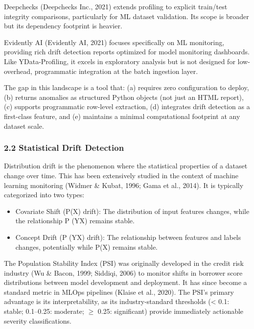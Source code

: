 \documentclass{article}
\begin{document}
Deepchecks (Deepchecks Inc., 2021) extends profiling to explicit
train/test integrity comparisons, particularly for ML dataset
validation. Its scope is broader but its dependency footprint is
heavier.

Evidently AI (Evidently AI, 2021) focuses specifically on ML monitoring,
providing rich drift detection reports optimized for model monitoring
dashboards. Like YData-Profiling, it excels in exploratory analysis but
is not designed for low-overhead, programmatic integration at the batch
ingestion layer.

The gap in this landscape is a tool that: (a) requires zero
configuration to deploy, (b) returns anomalies as structured Python
objects (not just an HTML report), (c) supports programmatic row-level
extraction, (d) integrates drift detection as a first-class feature, and
(e) maintains a minimal computational footprint at any dataset scale.

\subsubsection{2.2 Statistical Drift
Detection}\label{statistical-drift-detection}

Distribution drift is the phenomenon where the statistical properties of
a dataset change over time. This has been extensively studied in the
context of machine learning monitoring (Widmer \& Kubat, 1996; Gama et
al., 2014). It is typically categorized into two types:

\begin{itemize}
\item
  Covariate Shift (P(X) drift): The distribution of input features
  changes, while the relationship P (Y\textbar X) remains stable.
\item
  Concept Drift (P (Y\textbar X) drift): The relationship between
  features and labels changes, potentially while P(X) remains stable.
\end{itemize}

The Population Stability Index (PSI) was originally developed in the
credit risk industry (Wu \& Bacon, 1999; Siddiqi, 2006) to monitor
shifts in borrower score distributions between model development and
deployment. It has since become a standard metric in MLOps pipelines
(Klaise et al., 2020). The PSI's primary advantage is its
interpretability, as its industry-standard thresholds (\textless{} 0.1:
stable; 0.1--0.25: moderate; $\geq$ 0.25: significant) provide immediately
actionable severity classifications.
\end{document}
